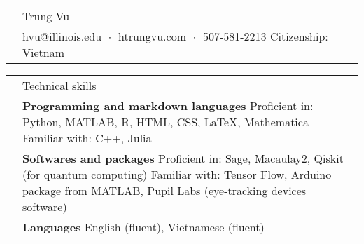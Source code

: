 \documentclass[letterpaper, 11pt]{article}
\newcommand{\headingfont}{\Large\color{Red}}
\newenvironment{SectionTable}[1]{
	\renewcommand*{\arraystretch}{1.7}
	\setlength{\tabcolsep}{10pt}
	\begin{longtable}{Rp{5.2in}} & #1 \\}
	{\end{longtable}\vspace{-.3cm}}
\begin{document}
	
	
	\begin{SectionTable}{\Huge Trung Vu} & 
		hvu@illinois.edu   $\;\boldsymbol{\cdot}\;$ 
		htrungvu.com 
		$\;\boldsymbol{\cdot}\;$ 
		507-581-2213 \newline
		Citizenship: Vietnam
	\end{SectionTable}
	
	
	
		\begin{SectionTable}{\headingfont Technical skills}
		& \textbf{Programming and markdown languages} \newline
		Proficient in: Python, MATLAB, R, HTML, CSS, \LaTeX, Mathematica \newline
		Familiar with: C++, Julia\\
		
		& \textbf{Softwares and packages} \newline
		Proficient in: Sage, Macaulay2, Qiskit (for quantum computing) \newline
		Familiar with: Tensor Flow, Arduino package from MATLAB, Pupil Labs (eye-tracking devices software) \\
		
		& \textbf{Languages} \newline
		English (fluent), Vietnamese (fluent)
	\end{SectionTable}
	
	
\end{document}
